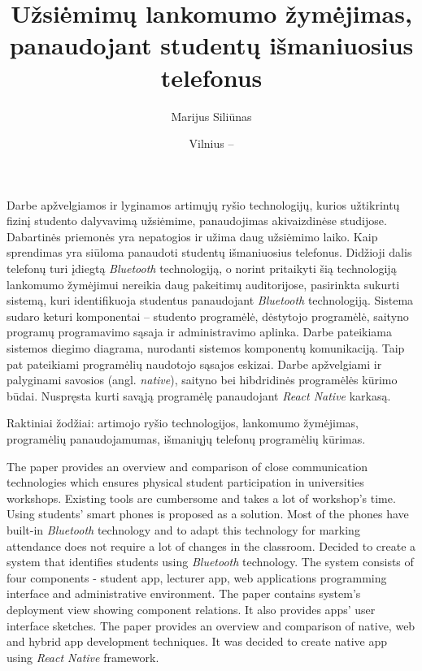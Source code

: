 \documentclass{VUMIFPSbakalaurinis}
\title{Užsiėmimų lankomumo žymėjimas, panaudojant studentų išmaniuosius telefonus}
\author{Marijus Siliūnas}
\date{Vilnius – \the\year}
\begin{document}
\maketitle


Darbe apžvelgiamos ir lyginamos artimųjų ryšio technologijų, kurios užtikrintų fizinį studento dalyvavimą užsiėmime, panaudojimas akivaizdinėse studijose. Dabartinės priemonės yra nepatogios ir užima daug užsiėmimo laiko. Kaip sprendimas yra siūloma panaudoti studentų išmaniuosius telefonus. Didžioji dalis telefonų turi įdiegtą \textit{Bluetooth} technologiją, o norint pritaikyti šią technologiją lankomumo žymėjimui nereikia daug pakeitimų auditorijose, pasirinkta sukurti sistemą, kuri identifikuoja studentus panaudojant \textit{Bluetooth} technologiją. Sistema sudaro keturi komponentai – studento programėlė, dėstytojo programėlė, saityno programų programavimo sąsaja ir administravimo aplinka. Darbe pateikiama sistemos diegimo diagrama, nurodanti sistemos komponentų komunikaciją. Taip pat pateikiami programėlių naudotojo sąsajos eskizai. Darbe apžvelgiami ir palyginami savosios (angl. \textit{native}), saityno bei hibdridinės programėlės kūrimo būdai. Nuspręsta kurti savąją programėlę panaudojant \textit{React Native} karkasą.

Raktiniai žodžiai: artimojo ryšio technologijos, lankomumo žymėjimas, programėlių panaudojamumas, išmaniųjų telefonų programėlių kūrimas.


The paper provides an overview and comparison of close communication technologies which ensures physical student participation in universities workshops.
Existing tools are cumbersome and takes a lot of workshop's time. Using students' smart phones is proposed as a solution. Most of the phones have built-in \textit{Bluetooth} technology and to adapt this technology for marking attendance does not require a lot of changes in the classroom. Decided to create a system that identifies students using \textit{Bluetooth} technology. The system consists of four components - student app, lecturer app, web applications programming interface and administrative environment. The paper contains system's deployment view showing component relations. It also provides apps' user interface sketches. The paper provides an overview and comparison of native, web and hybrid app development techniques. It was decided to create native app using \textit{React Native} framework.
\end{document}

